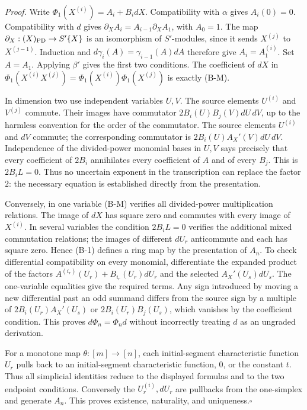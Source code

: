\emph{Proof.}
Write $\Phi_1(X^{(i)})=A_i+B_i dX$. Compatibility with $\alpha$ gives
$A_i(0)=0$. Compatibility with $d$ gives
$\partial_X A_i=A_{i-1}\partial_X A_1$, with $A_0=1$.
The map $\partial_X:(X)_{\rm PD}\to S'\{X\}$ is an isomorphism of
$S'$-modules, since it sends $X^{(j)}$ to $X^{(j-1)}$. Induction and
$d\gamma_i(A)=\gamma_{i-1}(A)dA$ therefore give $A_i=A_1^{(i)}$.
Set $A=A_1$. Applying $\beta'$ gives the first two conditions.
The coefficient of $dX$ in
$\Phi_1(X^{(i)}X^{(j)})=\Phi_1(X^{(i)})\Phi_1(X^{(j)})$
is exactly (B-M).

In dimension two use independent variables $U,V$. The source elements
$U^{(i)}$ and $V^{(j)}$ commute. Their images have commutator
$2B_i(U)B_j(V)dU\,dV$, up to the harmless convention for the order of
the commutator. The source elements $U^{(i)}$ and $dV$ commute; the
corresponding commutator is $2B_i(U)A_X'(V)dU\,dV$.
Independence of the divided-power monomial bases in $U,V$ says precisely
that every coefficient of $2B_i$ annihilates every coefficient of $A$
and of every $B_j$. This is $2B_iL=0$. Thus no uncertain exponent in
the transcription can replace the factor $2$: the necessary equation
is established directly from the presentation.

Conversely, in one variable (B-M) verifies all divided-power
multiplication relations. The image of $dX$ has square zero and
commutes with every image of $X^{(i)}$. In several variables the
condition $2B_iL=0$ verifies the additional mixed commutation relations;
the images of different $dU_r$ anticommute and each has square zero.
Hence (B-1) defines a ring map by the presentation of $A_n$.
To check differential compatibility on every monomial, differentiate
the expanded product of the factors
$A^{(i_r)}(U_r)+B_{i_r}(U_r)dU_r$ and the selected $A_X'(U_s)dU_s$.
The one-variable equalities give the required terms. Any sign
introduced by moving a new differential past an odd summand differs
from the source sign by a multiple of
$2B_i(U_r)A_X'(U_s)$ or $2B_i(U_r)B_j(U_s)$, which vanishes by the
coefficient condition. This proves $d\Phi_n=\Phi_n d$ without
incorrectly treating $d$ as an ungraded derivation.

For a monotone map $\theta:[m]\to[n]$, each initial-segment
characteristic function $U_r$ pulls back to an initial-segment
characteristic function, $0$, or the constant $t$. Thus all
simplicial identities reduce to the displayed formulas and to the
two endpoint conditions. Conversely the $U_r^{(i)},dU_r$ are
pullbacks from the one-simplex and generate $A_n$. This proves
existence, naturality, and uniqueness.\hfill$\square$

